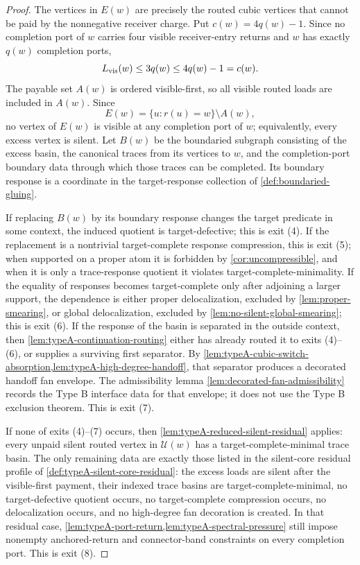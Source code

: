 \documentclass[11pt]{article}
\begin{document}
\begin{proof}
The vertices in $E(w)$ are precisely the routed cubic vertices that cannot be
paid by the nonnegative receiver charge.  Put $c(w)=4q(w)-1$.  Since no
completion port of $w$ carries four visible receiver-entry returns and $w$ has
exactly $q(w)$ completion ports,
\[
L_{\rm vis}(w)\le3q(w)\le4q(w)-1=c(w).
\]
The payable set $A(w)$ is ordered visible-first, so all visible routed loads are
included in \(A(w)\).  Since
\[
E(w)=\{u:r(u)=w\}\setminus A(w),
\]
no vertex of \(E(w)\) is visible at any completion port of \(w\);
equivalently, every excess vertex is silent.  Let $B(w)$ be the boundaried
subgraph consisting of the excess basin, the canonical traces from its vertices
to $w$, and the completion-port boundary data through which those traces can be
completed.  Its boundary response is a coordinate in the target-response
collection of \cref{def:boundaried-gluing}.

If replacing $B(w)$ by its boundary response changes the target predicate in
some context, the induced quotient is target-defective; this is exit (4).  If
the replacement is a nontrivial target-complete response compression, this is
exit (5); when supported on a proper atom it is forbidden by
\cref{cor:uncompressible}, and when it is only a trace-response quotient it
violates target-complete-minimality.  If the equality of responses becomes
target-complete only after adjoining a larger support, the dependence is either
proper delocalization, excluded by \cref{lem:proper-smearing}, or global
delocalization, excluded by \cref{lem:no-silent-global-smearing}; this is exit
(6).  If the response of the basin is separated in the outside context, then
\cref{lem:typeA-continuation-routing} either has already routed it to exits
(4)--(6), or supplies a surviving first separator.  By
\cref{lem:typeA-cubic-switch-absorption,lem:typeA-high-degree-handoff}, that
separator produces a decorated handoff fan envelope.  The admissibility lemma
\cref{lem:decorated-fan-admissibility} records the Type B interface data for
that envelope; it does not use the Type B exclusion theorem.  This is exit (7).

If none of exits (4)--(7) occurs, then
\cref{lem:typeA-reduced-silent-residual} applies: every unpaid silent routed
vertex in $\mathcal U(w)$ has a target-complete-minimal trace basin.  The only
remaining data are exactly those listed in the silent-core residual profile of
\cref{def:typeA-silent-core-residual}: the excess loads are silent after the
visible-first payment, their indexed trace basins are target-complete-minimal,
no target-defective quotient occurs, no target-complete compression occurs, no
delocalization occurs, and no high-degree fan decoration is created.  In that
residual case, \cref{lem:typeA-port-return,lem:typeA-spectral-pressure} still
impose nonempty anchored-return and connector-band constraints on every
completion port.  This is exit (8).
\end{proof}
\end{document}
